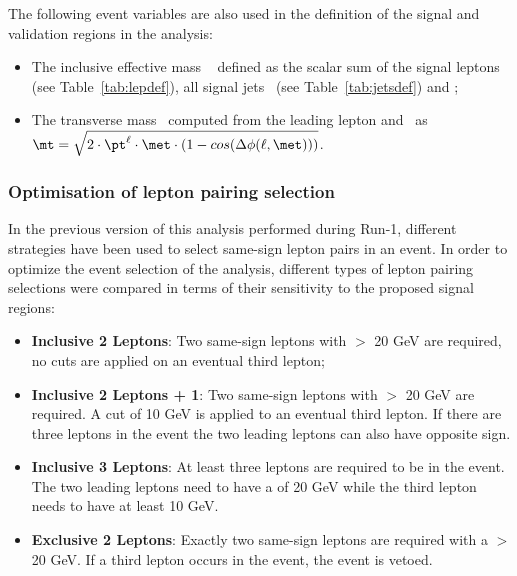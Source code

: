 The following event variables are also used in the definition of the signal and validation regions in the analysis:

\begin{itemize}
\item The inclusive effective mass \meff~ defined as the scalar sum of
  the signal leptons \pt (see Table~\ref{tab:lepdef}), all signal jets \pt\ (see Table~\ref{tab:jetsdef}) and \met;
\item The transverse mass \mt\ computed from the leading lepton and
\met\ as \newline $\mt = \sqrt{2 \cdot \pt^\ell \cdot \met \cdot (1 - cos(\Delta \phi(\ell, \met )))}$.
\end{itemize}

\subsubsection{Optimisation of lepton pairing selection}
\label{sec:pairing}

In the previous version of this analysis performed during Run-1, different strategies have been used to select same-sign lepton pairs in an event. In order to optimize the event selection of the analysis, different types of lepton pairing selections were compared in terms of their sensitivity to the proposed signal regions:

\begin{itemize}
  \item \textbf{Inclusive 2 Leptons}: Two same-sign leptons with \pt $>$ 20 GeV are required, no cuts are applied on an eventual third lepton;
  \item \textbf{Inclusive 2 Leptons + 1}: Two same-sign leptons with \pt $>$ 20 GeV are required. A \pt cut of 10 GeV is applied to an eventual third lepton. If there are three leptons in the event the two leading leptons can also have opposite sign.
  \item \textbf{Inclusive 3 Leptons}: At least three leptons are required to be in the event. The two leading leptons need to have a \pt of 20 GeV while the third lepton needs to have at least 10 GeV.
  \item \textbf{Exclusive 2 Leptons}: Exactly two same-sign leptons are required with a \pt $>$ 20 GeV. If a third lepton occurs in the event, the event is vetoed.
\end{itemize}


